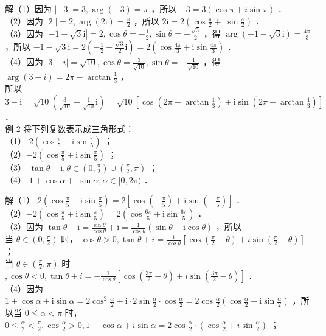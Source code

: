 \documentclass[10pt]{article}
\begin{document}
解（1）因为 \(|-3|=3, \arg (-3)=\pi\) ，所以 \(-3=3(\cos \pi+i \sin \pi)\) ．\\
（2）因为 \(|2 \mathrm{i}|=2, \arg (2 \mathrm{i})=\frac{\pi}{2}\) ，所以 \(2 \mathrm{i}=2\left(\cos \frac{\pi}{2}+\mathrm{i} \sin \frac{\pi}{2}\right)\) ．\\
（3）因为 \(|-1-\sqrt{3} \mathrm{i}|=2, \cos \theta=-\frac{1}{2}, \sin \theta=-\frac{\sqrt{3}}{2}\) ，得 \(\arg (-1-\sqrt{3} \mathrm{i})=\frac{4 \pi}{3}\) ，所以 \(-1-\sqrt{3} \mathrm{i}=2\left(-\frac{1}{2}-\frac{\sqrt{3}}{2} \mathrm{i}\right)=2\left(\cos \frac{4 \pi}{3}+\mathrm{i} \sin \frac{4 \pi}{3}\right)\) ．\\
（4）因为 \(|3-i|=\sqrt{10}, \cos \theta=\frac{3}{\sqrt{10}}, \sin \theta=-\frac{1}{\sqrt{10}}\) ，得 \(\arg (3-i)=2 \pi-\arctan \frac{1}{3}\) ，\\
所以 \(3-\mathrm{i}=\sqrt{10}\left(\frac{3}{\sqrt{10}}-\frac{1}{\sqrt{10}} \mathrm{i}\right)=\sqrt{10}\left[\cos \left(2 \pi-\arctan \frac{1}{3}\right)+\mathrm{i} \sin \left(2 \pi-\arctan \frac{1}{3}\right)\right]\) ．\\
例 2 将下列复数表示成三角形式：\\
（1） \(2\left(\cos \frac{\pi}{5}-\mathrm{i} \sin \frac{\pi}{5}\right)\) ；\\
（2）\(-2\left(\cos \frac{\pi}{5}+\mathrm{i} \sin \frac{\pi}{5}\right)\) ；\\
（3） \(\tan \theta+\mathrm{i}, \theta \in\left(0, \frac{\pi}{2}\right) \cup\left(\frac{\pi}{2}, \pi\right)\) ；\\
（4） \(1+\cos \alpha+\mathrm{i} \sin \alpha, \alpha \in[0,2 \pi)\) ．

解（1） \(2\left(\cos \frac{\pi}{5}-\mathrm{i} \sin \frac{\pi}{5}\right)=2\left[\cos \left(-\frac{\pi}{5}\right)+\mathrm{i} \sin \left(-\frac{\pi}{5}\right)\right]\) ．\\
（2）\(-2\left(\cos \frac{\pi}{5}+\mathrm{i} \sin \frac{\pi}{5}\right)=2\left(\cos \frac{6 \pi}{5}+\mathrm{i} \sin \frac{6 \pi}{5}\right)\) ．\\
（3）因为 \(\tan \theta+\mathrm{i}=\frac{\sin \theta}{\cos \theta}+\mathrm{i}=\frac{1}{\cos \theta}(\sin \theta+\mathrm{i} \cos \theta)\) ，所以\\
当 \(\theta \in\left(0, \frac{\pi}{2}\right)\) 时， \(\cos \theta>0, \tan \theta+i=\frac{1}{\cos \theta}\left[\cos \left(\frac{\pi}{2}-\theta\right)+i \sin \left(\frac{\pi}{2}-\theta\right)\right]\) ；\\
当 \(\theta \in\left(\frac{\pi}{2}, \pi\right)\) 时 \(, \cos \theta<0, \tan \theta+i=-\frac{1}{\cos \theta}\left[\cos \left(\frac{3 \pi}{2}-\theta\right)+i \sin \left(\frac{3 \pi}{2}-\theta\right)\right]\) ．\\
（4）因为 \(1+\cos \alpha+\mathrm{i} \sin \alpha=2 \cos ^{2} \frac{\alpha}{2}+\mathrm{i} \cdot 2 \sin \frac{\alpha}{2} \cdot \cos \frac{\alpha}{2}=2 \cos \frac{\alpha}{2}\left(\cos \frac{\alpha}{2}+\mathrm{i} \sin \frac{\alpha}{2}\right)\) ，所以当 \(0 \leqslant \alpha<\pi\) 时， \(0 \leqslant \frac{\alpha}{2}<\frac{\pi}{2}, \cos \frac{\alpha}{2}>0,1+\cos \alpha+i \sin \alpha=2 \cos \frac{\alpha}{2} \cdot\left(\cos \frac{\alpha}{2}+i \sin \frac{\alpha}{2}\right)\) ；
\end{document}
